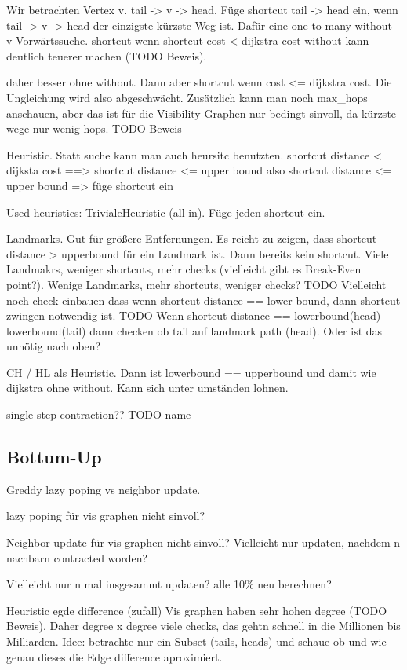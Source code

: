Wir betrachten Vertex v. tail -> v -> head.
Füge shortcut tail -> head ein, wenn tail -> v -> head der einzigste kürzste Weg ist.
Dafür eine one to many without v Vorwärtssuche.
shortcut wenn shortcut cost < dijkstra cost
without kann deutlich teuerer machen (TODO Beweis).

daher besser ohne without. Dann aber shortcut wenn cost <= dijkstra cost.
Die Ungleichung wird also abgeschwächt.
Zusätzlich kann man noch max\_hops anschauen, aber das ist für die Visibility Graphen nur bedingt sinvoll, da kürzste wege nur wenig hops. TODO Beweis

Heuristic.
Statt suche kann man auch heursitc benutzten.
shortcut distance < dijksta cost ==> shortcut distance <= upper bound
also shortcut distance <= upper bound => füge shortcut ein

Used heuristics:
TrivialeHeuristic (all in). Füge jeden shortcut ein.

Landmarks. Gut für größere Entfernungen.
Es reicht zu zeigen, dass shortcut distance > upperbound für ein Landmark ist. Dann bereits kein shortcut.
Viele Landmakrs, weniger shortcuts, mehr checks (vielleicht gibt es Break-Even point?). Wenige Landmarks, mehr shortcuts, weniger checks?
TODO Vielleicht noch check einbauen dass wenn shortcut distance == lower bound, dann shortcut zwingen notwendig ist.
TODO Wenn shortcut distance == lowerbound(head) - lowerbound(tail) dann checken ob tail auf landmark path (head). Oder ist das unnötig nach oben?

CH / HL als Heuristic.
Dann ist lowerbound == upperbound und damit wie dijkstra ohne without. Kann sich unter umständen lohnen.


single step contraction?? TODO name

\subsection{Bottum-Up}

Greddy lazy poping vs neighbor update.

lazy poping für vis graphen nicht sinvoll?

Neighbor update für vis graphen nicht sinvoll?
Vielleicht nur updaten, nachdem n nachbarn contracted worden?

Vielleicht nur n mal insgesammt updaten? alle 10\% neu berechnen?



Heuristic egde difference (zufall)
Vis graphen haben sehr hohen degree (TODO Beweis).
Daher degree x degree viele checks, das gehtn schnell in die Millionen bis Milliarden.
Idee: betrachte nur ein Subset (tails, heads) und schaue ob und wie genau dieses die Edge difference aproximiert.

